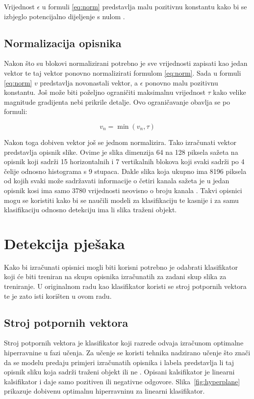 \documentclass[times, utf8, zavrsni]{fer}
\begin{document}
Vrijednost $\epsilon$ u formuli \ref{eq:norm} predstavlja malu pozitivnu konstantu kako bi se izbjeglo potencijalno dijeljenje s nulom \citep{tomasi2012histograms}.

\section{Normalizacija opisnika}
Nakon što su blokovi normalizirani potrebno je sve vrijednosti zapisati kao jedan vektor te taj vektor ponovno normalizirati formulom \ref{eq:norm}. Sada u formuli \ref{eq:norm} \(v\) predstavlja novonastali vektor, a $\epsilon$ ponovno malu pozitivnu konstantu. Još može biti poželjno ograničiti maksimalnu vrijednost $\tau$ kako velike magnitude gradijenta nebi prikrile detalje. Ovo ograničavanje obavlja se po formuli:

\begin{equation}
	v_n = \min(v_n, \tau)
	\label{eq:limit}
\end{equation}

Nakon toga dobiven vektor još se jednom normalizira. Tako izračunati vektor predstavlja opisnik slike. Ovime je slika dimenzija 64 na 128 piksela sažeta na opisnik koji sadrži 15 horizontalnih i 7 vertikalnih blokova koji svaki sadrži po 4 čelije odnosno histograma s 9 stupaca. Dakle slika koja ukupno ima 8196 piksela od kojih svaki može sadržavati informacije o četiri kanala sažeta je u jedan opisnik kosi ima samo 3780 vrijednosti neovisno o broju kanala \citep{tomasi2012histograms}. Takvi opisnici mogu se koristiti kako bi se naučili modeli za klasifikaciju te kasnije i za samu klasifikaciju odnosno detekciju ima li slika traženi objekt.

\chapter{Detekcija pješaka}
Kako bi izračunati opisnici mogli biti korisni potrebno je odabrati klasifikator koji će biti treniran na skupu opisnika izračunatih za zadani skup slika za treniranje. U originalnom radu \cite{dalal2005histograms} kao klasifikator koristi se stroj potpornih vektora te je zato isti korišten u ovom radu.

\section{Stroj potpornih vektora}
Stroj potpornih vektora  je klasifikator koji razrede odvaja izračunom optimalne hiperravnine u fazi učenja. Za učenje se koristi tehnika nadzirano učenje što znači da se modelu predaju primjeri izračunatih opisnika i labela predstavlja li taj opisnik sliku koja sadrži traženi objekt ili ne \citep{svm}. Opisani kalsifikator je linearni kalsifikator i daje samo pozitiven ili negativne odgovore. Slika~\ref{fig:hyperplane} prikazuje dobivenu optimalnu hiperravninu za linearni klasifikator.
\end{document}
